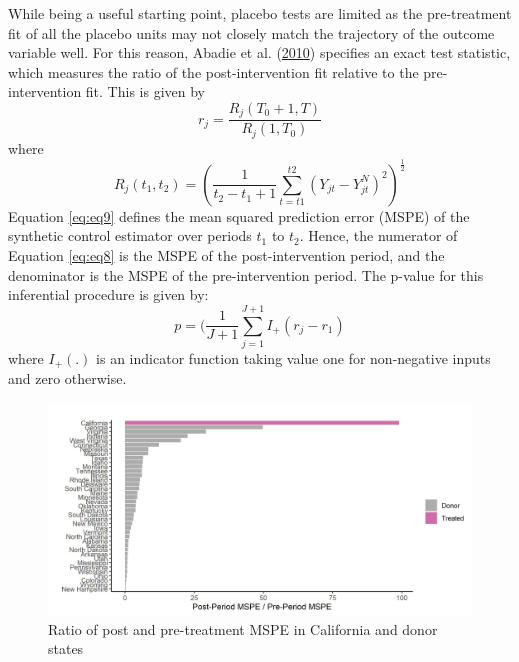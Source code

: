 \documentclass[12pt,nobind, a4paper]{reedthesis}
\begin{document}
 While being a useful starting point, placebo tests are limited as the pre-treatment fit of all the placebo units may not closely match the trajectory of the outcome variable well. For this reason, Abadie et al. (\protect\hyperlink{ref-abadie_synthetic_2010}{2010}) specifies an exact test statistic, which measures the ratio of the post-intervention fit relative to the pre-intervention fit. This is given by
 \begin{equation}
 r_{j}= \frac{R_{j}(T_{0}+1,T)}{R_{j}(1,T_{0})}
 \label{eq:eq8}
 \end{equation}
 where
 \begin{equation}
 R_{j}(t_{1},t_{2})= (\frac{1}{t_{2}-t_{1}+1} \sum_{t=t1}^{t2}(Y_{jt}-Y_{jt}^{N})^2)^{\frac{1}{2}}
 \label{eq:eq9}
 \end{equation}
 Equation \eqref{eq:eq9} defines the mean squared prediction error (MSPE) of the synthetic control estimator over periods \(t_{1}\) to \(t_{2}\). Hence, the numerator of Equation \eqref{eq:eq8} is the MSPE of the post-intervention period, and the denominator is the MSPE of the pre-intervention period. The p-value for this inferential procedure is given by:
 \begin{equation}
 p= (\frac{1}{J+1} \sum_{j=1}^{J+1}I_{+}(r_{j}-r_{1})
 \label{eq:eq10}
 \end{equation}
 where \(I_{+}(.)\) is an indicator function taking value one for non-negative inputs and zero otherwise.
 \begin{figure}

 {\centering \includegraphics[width=1\linewidth]{figure/calmspe} 

 }

 \caption{Ratio of post and pre-treatment MSPE in California and donor states}\label{fig:mspe}
 \end{figure}
\end{document}
